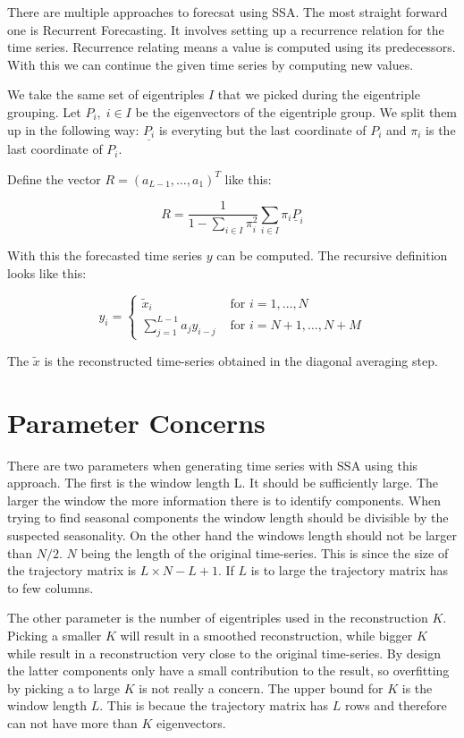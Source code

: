 There are multiple approaches to forecsat using SSA. The most straight forward one is Recurrent Forecasting. It involves setting up a recurrence relation for the time series. Recurrence relating means a value is computed using its predecessors. With this we can continue the given time series by computing new values. 

We take the same set of eigentriples $I$ that we picked during the eigentriple grouping. Let $P_i, \; i \in I$ be the eigenvectors of the eigentriple group. We split them up in the following way: $\underline{P_i}$ is everyting but the last coordinate of $P_i$ and $\pi_i$ is the last coordinate of $P_i$. 

Define the vector $R = (a_{L-1}, \dots, a_1)^T$ like this:

\begin{equation}
   R=\frac{1}{1-\sum_{i \in I} \pi_{i}^{2}} \sum_{i \in I} \pi_{i} \underline{P}_{i}
   \label{eq:r-def}
\end{equation}

With this the forecasted time series $y$ can be computed. The recursive definition looks like this:

\begin{equation}
  y_{i}=\left\{\begin{array}{ll}
\widetilde{x}_{i} & \text { for } i=1, \ldots, N \\
\sum_{j=1}^{L-1} a_{j} y_{i-j} & \text { for } i=N+1, \ldots, N+M
\end{array}\right. 
\end{equation}

The $\tilde{x}$ is the reconstructed time-series obtained in the diagonal averaging step. 

\section{Parameter Concerns}

There are two parameters when generating time series with SSA using this approach. The first is the window length L. It should be sufficiently large. The larger the window the more information there is to identify components. When trying to find seasonal components the window length should be divisible by the suspected seasonality. On the other hand the windows length should not be larger than $N/2$. $N$ being the length of the original time-series. This is since the size of the trajectory matrix is $L \times N-L+1$. If $L$ is to large the trajectory matrix has to few columns. 

The other parameter is the number of eigentriples used in the reconstruction $K$. Picking a smaller $K$ will result in a smoothed reconstruction, while bigger $K$ while result in a reconstruction very close to the original time-series. By design the latter components only have a small contribution to the result, so overfitting by picking a to large $K$ is not really a concern. The upper bound for $K$ is the window length $L$. This is becaue the trajectory matrix has $L$ rows and therefore can not have more than $K$ eigenvectors. 